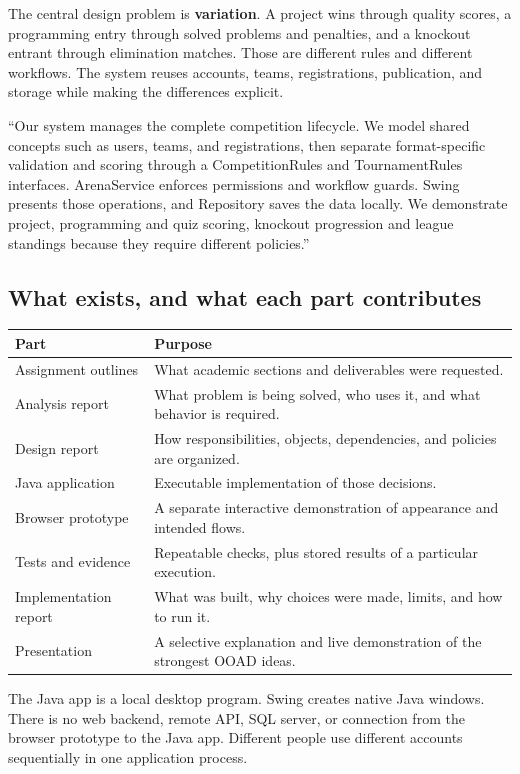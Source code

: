 \documentclass[12pt]{article}
\begin{document}
The central design problem is \textbf{variation}. A project wins through quality scores, a programming entry through solved problems and penalties, and a knockout entrant through elimination matches. Those are different rules and different workflows. The system reuses accounts, teams, registrations, publication, and storage while making the differences explicit.

\begin{contentbox}
``Our system manages the complete competition lifecycle. We model shared concepts such as users, teams, and registrations, then separate format-specific validation and scoring through a CompetitionRules and TournamentRules interfaces. ArenaService enforces permissions and workflow guards. Swing presents those operations, and Repository saves the data locally. We demonstrate project, programming and quiz scoring, knockout progression and league standings because they require different policies.''
\end{contentbox}

\subsection{What exists, and what each part contributes}
\begin{tabularx}{\linewidth}{lY}\toprule Part & Purpose\\\midrule
Assignment outlines & What academic sections and deliverables were requested.\\
Analysis report & What problem is being solved, who uses it, and what behavior is required.\\
Design report & How responsibilities, objects, dependencies, and policies are organized.\\
Java application & Executable implementation of those decisions.\\
Browser prototype & A separate interactive demonstration of appearance and intended flows.\\
Tests and evidence & Repeatable checks, plus stored results of a particular execution.\\
Implementation report & What was built, why choices were made, limits, and how to run it.\\
Presentation & A selective explanation and live demonstration of the strongest OOAD ideas.\\\bottomrule
\end{tabularx}

The Java app is a local desktop program. Swing creates native Java windows. There is no web backend, remote API, SQL server, or connection from the browser prototype to the Java app. Different people use different accounts sequentially in one application process.
\end{document}
